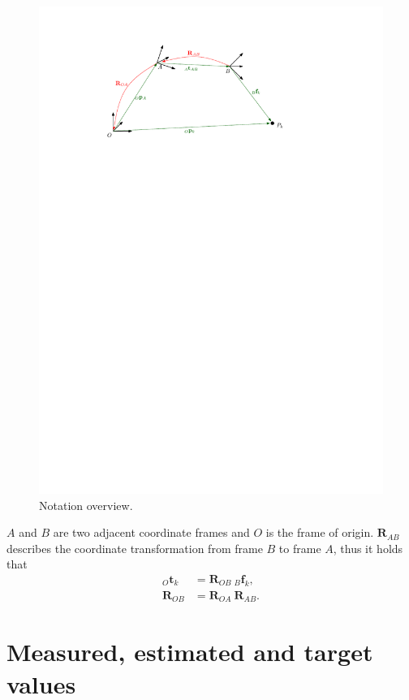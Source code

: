 \begin{figure}[H]
     \centering
     \includegraphics[scale=0.8]{img/notation}
     \caption{Notation overview.}
     \label{fig:notation}
\end{figure}
  
$A$ and $B$ are two adjacent coordinate frames and $O$ is the frame of origin.
$\mathbf{R}_{AB}$ describes the coordinate transformation from frame $B$ to frame $A$, thus it holds that 
	\[
		\begin{aligned}
			_O\mathbf{t}_k  &= \mathbf{R}_{OB} \ _B\mathbf{f}_k, \\
			\mathbf{R}_{OB} &= \mathbf{R}_{OA} \ \mathbf{R}_{AB}.
	  \end{aligned} 
	\]

\section{Measured, estimated and target values}

